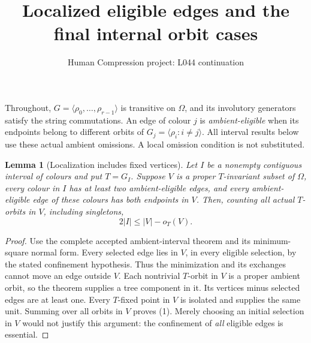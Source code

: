 \documentclass[11pt,a4paper]{article}
\title{Localized eligible edges and the final internal orbit cases}
\author{Human Compression project: L044 continuation}
\date{}
\newtheorem{lemma}{Lemma}
\newcommand{\gen}[1]{\langle#1\rangle}
\begin{document}
\maketitle
Throughout, $G=\gen{\rho_0,\ldots,\rho_{r-1}}$ is transitive
on $\Omega$, and its involutory generators satisfy the string
commutations. An edge of colour $j$ is \emph{ambient-eligible}
when its endpoints belong to different orbits of
$G_j=\gen{\rho_i:i\ne j}$. All interval results below use these
actual ambient omissions. A local omission condition is not substituted.

\begin{lemma}[Localization includes fixed vertices]\label{local}
Let $I$ be a nonempty contiguous interval of colours and put $T=G_I$.
Suppose $V$ is a proper $T$-invariant subset of $\Omega$, every colour
in $I$ has at least two ambient-eligible edges, and \emph{every}
ambient-eligible edge of these colours has both endpoints in $V$.
Then, counting all actual $T$-orbits in $V$, including singletons,
\[
                     2|I|\le |V|-o_T(V).                 \tag{1}
\]
\end{lemma}
\begin{proof}
Use the complete accepted ambient-interval theorem and its
minimum-square normal form. Every selected edge lies in $V$, in
every eligible selection, by the stated confinement hypothesis.
Thus the minimization and its exchanges cannot move an edge outside
$V$. Each nontrivial $T$-orbit in $V$ is a proper ambient orbit,
so the theorem supplies a tree component in it. Its vertices minus
selected edges are at least one. Every $T$-fixed point in $V$ is
isolated and supplies the same unit. Summing over all orbits in $V$
proves (1). Merely choosing an initial selection in $V$ would not
justify this argument: the confinement of \emph{all} eligible edges
is essential.
\end{proof}
\end{document}
